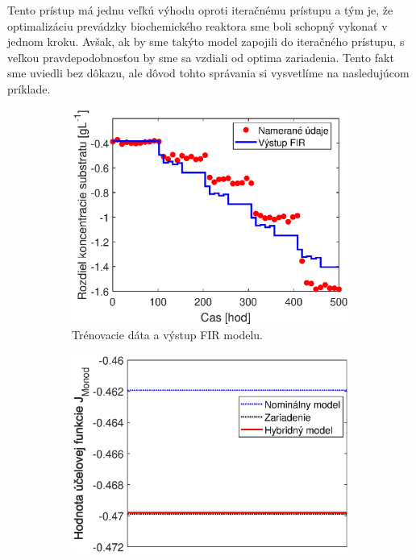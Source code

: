 Tento prístup má jednu veľkú výhodu oproti iteračnému prístupu a tým je, že optimalizáciu prevádzky biochemického reaktora sme boli schopný vykonať v jednom kroku. Avšak, ak by sme takýto model zapojili do iteračného prístupu, s veľkou pravdepodobnosťou by sme sa vzdiali od optima zariadenia. Tento fakt sme uviedli bez dôkazu, ale dôvod tohto správania si vysvetlíme na nasledujúcom príklade.
\begin{figure}
	\centering
	\begin{subfigure}[b]{0.49\textwidth}
		\centering
		\includegraphics[width=\linewidth]{images/hybrid_multipleStep_data}
		\caption{Trénovacie dáta a výstup FIR modelu.\newline \newline}
		\label{fig:hybrid_multipleStep_data}
	\end{subfigure}
	\hfill
	\begin{subfigure}[b]{0.49\textwidth}
		\centering
		\includegraphics[width=\linewidth]{images/hybrid_multipleStep_costFun}

\end{subfigure}
\end{figure}
